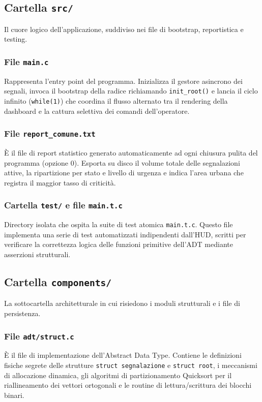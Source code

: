 \documentclass[12pt, a4paper]{article}
\begin{document}
\subsection{Cartella \texttt{src/}}
Il cuore logico dell'applicazione, suddiviso nei file di bootstrap, reportistica e testing.

\subsubsection{File \texttt{main.c}}
Rappresenta l'entry point del programma. Inizializza il gestore asincrono dei segnali, invoca il bootstrap della radice richiamando \texttt{init\_root()} e lancia il ciclo infinito (\texttt{while(1)}) che coordina il flusso alternato tra il rendering della dashboard e la cattura selettiva dei comandi dell'operatore.

\subsubsection{File \texttt{report\_comune.txt}}
È il file di report statistico generato automaticamente ad ogni chiusura pulita del programma (opzione 0). Esporta su disco il volume totale delle segnalazioni attive, la ripartizione per stato e livello di urgenza e indica l'area urbana che registra il maggior tasso di criticità.

\subsubsection{Cartella \texttt{test/} e file \texttt{main.t.c}}
\label{sec:testdir}
Directory isolata che ospita la suite di test atomica \texttt{main.t.c}. Questo file implementa una serie di test automatizzati indipendenti dall'HUD, scritti per verificare la correttezza logica delle funzioni primitive dell'ADT mediante asserzioni strutturali.

\subsection{Cartella \texttt{components/}}
La sottocartella architetturale in cui risiedono i moduli strutturali e i file di persistenza.

\subsubsection{File \texttt{adt/struct.c}}
È il file di implementazione dell'Abstract Data Type. Contiene le definizioni fisiche segrete delle strutture \texttt{struct segnalazione} e \texttt{struct root}, i meccanismi di allocazione dinamica, gli algoritmi di partizionamento Quicksort per il riallineamento dei vettori ortogonali e le routine di lettura/scrittura dei blocchi binari.
\end{document}
